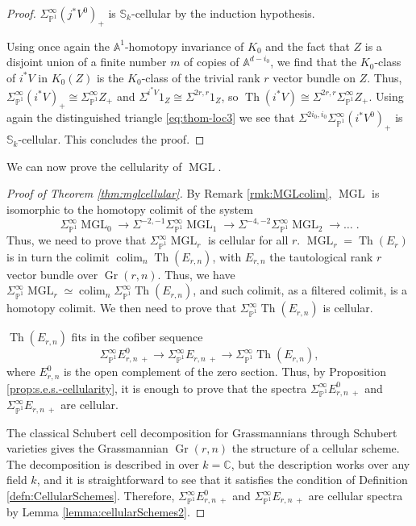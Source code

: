 \documentclass[10pt]{amsart}
\theoremstyle{definition}
\theoremstyle{plain}
\numberwithin{equation}{section}
\newcommand{\0}{\emptyset}
\newcommand{\A}{{\mathbb A}}
\newcommand{\C}{{\mathbb C}}
\renewcommand{\P}{{\mathbb P}}
\newcommand{\MGL}{{\operatorname{MGL}}}
\newcommand{\Gr}{{\operatorname{Gr}}}
\newcommand{\Th}{{\operatorname{Th}}}
\newcommand{\colim}{{\operatorname*{colim}}}
\begin{document}
\begin{proof}
$\Sigma^\infty_{\P^1}(j^*V^0)_+$ is $\mathbb{S}_k$-cellular by the induction hypothesis.

Using once again the $\A^1$-homotopy invariance of $K_0$ and the fact that $Z$ is a disjoint union of a finite number $m$ of copies of $\A^{d-i_0}$, we find that the $K_0$-class of $i^*V$ in $K_0(Z)$ is the $K_0$-class of the trivial rank $r$ vector bundle on $Z$. Thus, $\Sigma^\infty_{\P^1}(i^*V)_+\cong \Sigma^\infty_{\P^1}Z_+$ and $\Sigma^{i^*V}1_Z\cong \Sigma^{2r, r}1_Z$, so $\Th(i^*V)\cong \Sigma^{2r,r}\Sigma^\infty_{\P^1}Z_+$. Using again the distinguished triangle \eqref{eq:thom-loc3} we see that $\Sigma^{2i_0, i_0}\Sigma^\infty_{\P^1}(i^*V^0)_+$ is  $\mathbb{S}_k$-cellular. This concludes the proof.
\end{proof}

We can now prove the cellularity of $\MGL$.

\begin{proof}[Proof of Theorem \ref{thm:mglcellular}]
    By Remark \ref{rmk:MGLcolim}, $\MGL$ is isomorphic to the homotopy colimit of the system
    $$\Sigma^\infty_{\P^1}\MGL_0 \to \Sigma^{-2,-1}\Sigma^\infty_{\P^1}\MGL_1 \to \Sigma^{-4,-2}\Sigma^\infty_{\P^1}\MGL_2 \to \ldots \; .$$ 
    Thus, we need to prove that $\Sigma_{\P^1}^\infty \MGL_r$ is cellular for all $r$. $\MGL_r=\Th(E_r)$ is in turn the colimit $\colim_n\Th(E_{r,n})$, with $E_{r,n}$ the tautological rank $r$ vector bundle over $\Gr(r,n)$. Thus, we have $\Sigma_{\P^1}^\infty \MGL_r \simeq \colim_n \Sigma_{\P^1}^\infty \Th(E_{r,n})$, and such colimit, as a filtered colimit, is a homotopy colimit. We then need to prove that $\Sigma_{\P^1}^\infty \Th(E_{r,n})$ is cellular. 
    
    $\Th(E_{r,n})$ fits in the cofiber sequence
    $$\Sigma_{\P^1}^\infty E_{r,n \; +}^0 \to \Sigma_{\P^1}^\infty E_{r,n \; +} \to \Sigma_{\P^1}^\infty \Th(E_{r,n}),$$
    where $E_{r,n}^0$ is the open complement of the zero section. Thus, by Proposition \ref{prop:s.e.s.-cellularity}, it is enough to prove that the spectra $\Sigma_{\P^1}^\infty E_{r,n \; +}^0$ and $\Sigma_{\P^1}^\infty E_{r,n \; +}$ are cellular. 

    The classical Schubert cell decomposition for Grassmannians through Schubert varieties gives the Grassmannian $\Gr(r,n)$ the structure of a cellular scheme. The decomposition is described in \cite[Chapter 1, Section 5]{Griffith:AlgGeom} over $k=\C$, but the description works over any field $k$, and it is straightforward to see that it satisfies the condition of Definition \ref{defn:CellularSchemes}. Therefore, $\Sigma_{\P^1}^\infty E_{r,n \; +}^0$ and $\Sigma_{\P^1}^\infty E_{r,n \; +}$ are cellular spectra by Lemma \ref{lemma:cellularSchemes2}.
\end{proof}
\end{document}
